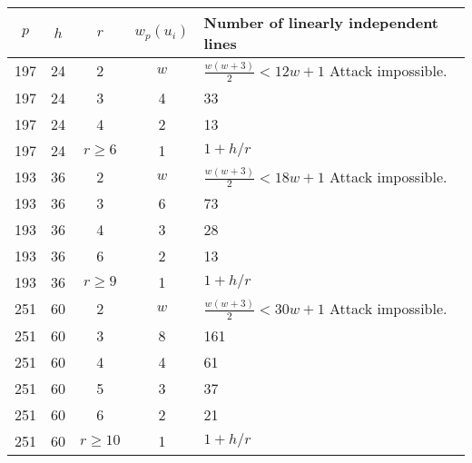 \documentclass[a4paper]{article}
\begin{document}
\begin{tabular}{|c|c|c|c|l|}
\hline
$p$ & $h$ & $r$ & $w_p(u_i)$ & Number of linearly independent lines  \\
\hline
197 & 24 & 2 & $w$ & $\frac{w(w+3)}{2} < 12w+1$ Attack impossible. \\
\hline
197 & 24 & 3 & 4 & 33\\
\hline
197 & 24 & 4 & 2 & 13\\
\hline
197 & 24 & $r \geq 6$ & 1 & $1 + h/r$ \\
\hline
193 & 36 & 2 & $w$ & $\frac{w(w+3)}{2} < 18w+1$ Attack impossible. \\
\hline
193 & 36 & 3 & 6 & 73\\
\hline
193 & 36 & 4 & 3 & 28\\
\hline
193 & 36 & 6 & 2 & 13\\
\hline
193 & 36 & $r \geq 9$ & 1 & $1 + h/r$ \\
\hline
251 & 60 & 2 & $w$ & $\frac{w(w+3)}{2} < 30w+1$ Attack impossible. \\
\hline
251 & 60 & 3 & 8 & 161\\
\hline
251 & 60 & 4 & 4 & 61\\
\hline
251 & 60 & 5 & 3 & 37\\
\hline
251 & 60 & 6 & 2 & 21\\
\hline
251 & 60 & $r \geq 10$ & 1 & $1 + h/r$ \\
\hline
\end{tabular}
\end{document}

